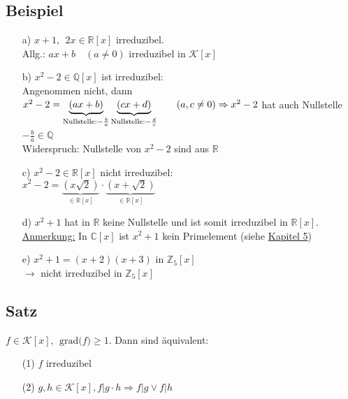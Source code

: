 \documentclass[12pt,titlepage, pdf]{article}
\newcommand{\grad}[1]{\textrm{grad(}#1\textrm{)}}
\newcommand{\R}{\mathds{R}}
\newcommand{\K}{\mathcal{K}}
\newcommand{\uline}[1]{\underline{#1}}
\renewcommand{\>}{\rightarrow}
\renewcommand{\*}{\cdot}
\begin{document}
		      	\subsection{Beispiel}
		      	\begin{itemize}
		      		\item[a)]
		      		      $x+1,~~ 2x \in \R[x]$ irreduzibel.\\
		      		      Allg.: $ax +b \quad (a\neq 0)$ irreduzibel in $\K[x]$
		      		\item[b)]
		      		      $x^2 - 2 \in \mathds{Q}[x]$ ist irreduzibel: \\
		      		      Angenommen nicht, dann $x^2 - 2 = \underbrace{(ax + b)}_{\text{Nullstelle:} -\frac{b}{a}} \underbrace{(cx+d)}_{\text{Nullstelle:} -\frac{d}{c}}\qquad(a,c\neq0) \\
		      		      \Rightarrow x^2 -2$ hat auch Nullstelle $-\frac{b}{a} \in \mathds{Q}$~\Lightning\\
		      		      Widerspruch: Nullstelle von $x^2 -2$ sind aus $\R$
		      		\item[c)] $x^2 -2 \in \R[x]$ nicht irreduzibel: \\
		      		      $x^2 - 2 = \underbrace{(x\sqrt{2})}_{\in \R[x]} \cdot \underbrace{(x+\sqrt{2})}_{\in \R[x]}$
		      		\item[d)] $x^2+1$ hat in $\R$ keine Nullstelle und ist somit irreduzibel in $\R[x]$. \\
		      		      \uline{Anmerkung:} In $\mathds{C}[x]$ ist $x^2 +1$ kein Primelement (siehe \hyperref[5]{Kapitel 5})
		      		\item[e)]
		      		      $x^2 +1 = (x+2)(x+3)$ in $\mathds{Z}_5[x]$\\
		      		      $\rightarrow$ nicht irreduzibel in $\mathds{Z}_5[x]$ 
		      	\end{itemize}
		      	\subsection{Satz}
		      	$f \in \K[x], ~~\grad{f} \geq 1$. Dann sind äquivalent: 
		      	\begin{itemize}
		      		\item[(1)] $f$ irreduzibel
		      		\item[(2)] $g,h \in \K[x], f \vert g\cdot h \Rightarrow f \vert g \lor f\vert h$
		      	\end{itemize}
\end{document}

